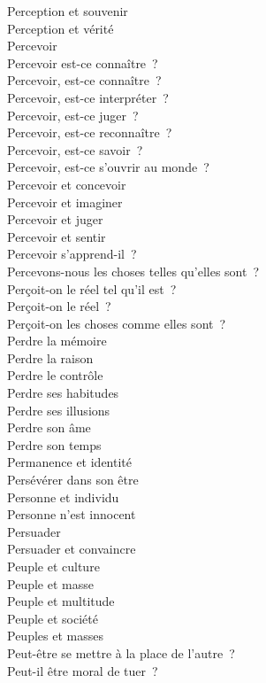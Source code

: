 \documentclass[a4paper,12pt]{article}
\begin{document}
Perception et souvenir \\
Perception et vérité \\
Percevoir \\
Percevoir est-ce connaître ? \\
Percevoir, est-ce connaître ? \\
Percevoir, est-ce interpréter ? \\
Percevoir, est-ce juger ? \\
Percevoir, est-ce reconnaître ? \\
Percevoir, est-ce savoir ? \\
Percevoir, est-ce s'ouvrir au monde ? \\
Percevoir et concevoir \\
Percevoir et imaginer \\
Percevoir et juger \\
Percevoir et sentir \\
Percevoir s'apprend-il ? \\
Percevons-nous les choses telles qu'elles sont ? \\
Perçoit-on le réel tel qu'il est ? \\
Perçoit-on le réel ? \\
Perçoit-on les choses comme elles sont ? \\
Perdre la mémoire \\
Perdre la raison \\
Perdre le contrôle \\
Perdre ses habitudes \\
Perdre ses illusions \\
Perdre son âme \\
Perdre son temps \\
Permanence et identité \\
Persévérer dans son être \\
Personne et individu \\
Personne n'est innocent \\
Persuader \\
Persuader et convaincre \\
Peuple et culture \\
Peuple et masse \\
Peuple et multitude \\
Peuple et société \\
Peuples et masses \\
Peut-être se mettre à la place de l'autre ? \\
Peut-il être moral de tuer ? \\
\end{document}
